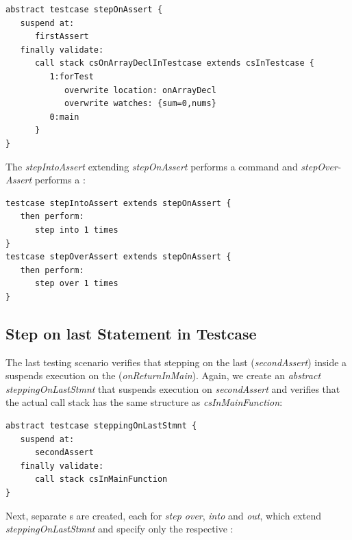 \begin{lstlisting}[language=testingDSL,caption=Abstract \ic{DebuggerTestcase},
label=lst:AbstractDebuggerTest]
abstract testcase stepOnAssert {
   suspend at: 
      firstAssert
   finally validate:
      call stack csOnArrayDeclInTestcase extends csInTestcase {
         1:forTest
            overwrite location: onArrayDecl
            overwrite watches: {sum=0,nums}
         0:main                      
      }
}
\end{lstlisting}

The  \emph{stepIntoAssert} extending
\emph{stepOnAssert} performs a  command and \emph{stepOver- Assert}
performs a :

\begin{lstlisting}[language=testingDSL,
caption=Extending \ic{DebuggerTestcase}s,label=lst:extendDTC] 
testcase stepIntoAssert extends stepOnAssert {            
   then perform:                         
      step into 1 times                            
}
testcase stepOverAssert extends stepOnAssert {            
   then perform:                         
      step over 1 times                            
}
\end{lstlisting}
\vspace{-1mm}
\subsection{Step on last Statement in Testcase}

The last testing scenario verifies that stepping on the last 
(\emph{secondAssert}) inside a  suspends execution on the 
 (\emph{onReturnInMain}).
Again, we create an \emph{abstract} 
\emph{steppingOnLastStmnt} that suspends
execution on \emph{secondAssert} and verifies that the actual call stack has the
same structure as  \emph{csInMainFunction}:

\begin{lstlisting}[language=testingDSL,
caption=Assumptions after suspending program execution in \emph{main}]
abstract testcase steppingOnLastStmnt {
   suspend at: 
      secondAssert
   finally validate:
      call stack csInMainFunction
}
\end{lstlisting}

Next, separate s are created, each for 
\emph{step over}, \emph{into} and \emph{out}, which extend
\emph{steppingOnLastStmnt} and specify only the respective :

